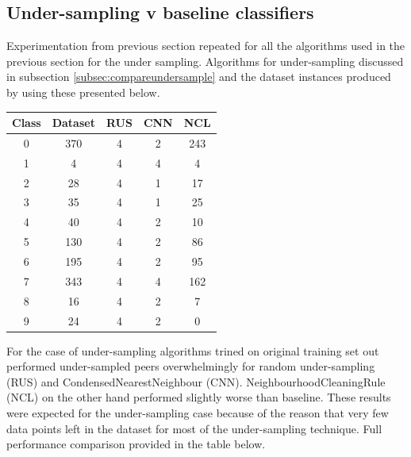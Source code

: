 \documentclass[12pt]{article}
\begin{document}
\subsection{Under-sampling v baseline classifiers} \label{subsec:undervbase}

Experimentation from previous section repeated for all the algorithms used in the previous section for the under sampling.
Algorithms for under-sampling discussed in subsection \ref{subsec:compareundersample} and the dataset instances produced by using these presented below.

\begin{center}
    \begin{tabular}{||c c c c c||} 
    \hline
    Class  & Dataset & RUS & CNN & NCL\\ [0.5ex] 
    \hline\hline
    0 & 370 & 4 & 2 & 243\\ 
    \hline
    1 & 4 & 4 & 4 & 4\\
    \hline
    2 & 28 & 4 & 1 & 17\\
    \hline
    3 & 35 & 4 & 1 & 25\\
    \hline
    4 & 40 & 4 & 2 & 10\\
    \hline
    5 & 130 & 4 & 2 & 86\\
    \hline
    6 & 195 & 4 & 2 & 95\\
    \hline
    7 & 343 & 4 & 4 & 162\\
    \hline
    8 & 16 & 4 & 2 & 7\\
    \hline
    9 & 24 & 4 & 2 & 0\\ [1ex] 
    \hline
   \end{tabular}
\end{center}

For the case of under-sampling algorithms trined on original training set out performed under-sampled peers overwhelmingly for random under-sampling (RUS) and CondensedNearestNeighbour (CNN). NeighbourhoodCleaningRule (NCL) on the other hand performed slightly worse than baseline. These results were expected for the under-sampling case because of the reason that very few data points left in the dataset for most of the under-sampling technique. Full performance comparison provided in the table below.
\end{document}
